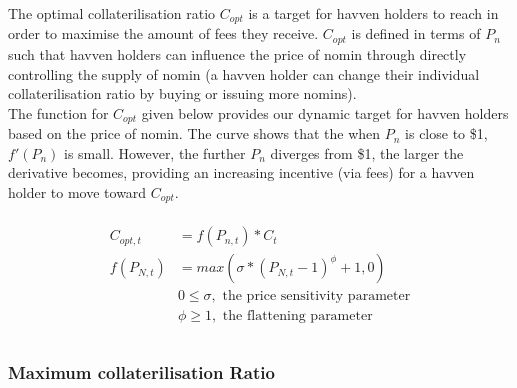 \noindent The optimal collaterilisation ratio $C_{opt}$ is a target for havven holders to reach in order to maximise the amount of fees they receive. $C_{opt}$ is defined in terms of $P_n$ such that havven holders can influence the price of nomin through directly controlling the supply of nomin (a havven holder can change their individual collaterilisation ratio by buying or issuing more nomins). \\
 
\noindent The function for $C_{opt}$ given below provides our dynamic target for havven holders based on the price of nomin. The curve shows that the when $P_n$ is close to \$1, $ f'(P_n) $ is small. However, the further $P_n$ diverges from \$1, the larger the derivative becomes, providing an increasing incentive (via fees) for a havven holder to move toward $C_{opt}$.

\begin{gather} 
\begin{align}
\begin{split}
C_{opt,t} &= f(P_{n,t}) * C_t  \\ 
f(P_{N,t}) &= max(\sigma * (P_{N,t} - 1)^{\phi} + 1, 0) \\
& 0 \leq \sigma, \text{ the price sensitivity parameter} \\
& \phi \geq 1, \text{ the flattening parameter} \\
\end{split}
\end{align}
\end{gather}


\begin{center}
\end{center}

\newpage

\subsubsection{Maximum collaterilisation Ratio}

